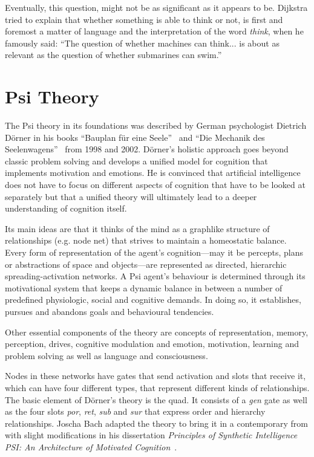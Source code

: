 Eventually, this question, might not be as significant as it appears to be. Dijkstra tried to explain that whether something is able to think or not, is first and foremost a matter of language and the interpretation of the word \emph{think}, when he famously said: ``The question of whether machines can think... is about as relevant as the question of whether submarines can swim.''

    \section{Psi Theory}
The Psi theory in its foundations was described by German psychologist Dietrich Dörner in his books ``Bauplan für eine Seele''~\cite{Doerner1998} and ``Die Mechanik des Seelenwagens''~\cite{dorner2002mechanik} from 1998 and 2002. Dörner's holistic approach goes beyond classic problem solving and develops a unified model for cognition that implements motivation and emotions. He is convinced that artificial intelligence does not have to focus on different aspects of cognition that have to be looked at separately but that a unified theory will ultimately lead to a deeper understanding of cognition itself.

Its main ideas are that it thinks of the mind as a graphlike structure of relationships (e.g. node net) that strives to maintain a homeostatic balance. Every form of representation of the agent's cognition---may it be percepts, plans or abstractions of space and objects---are represented as directed, hierarchic spreading-activation networks. A Psi agent's behaviour is determined through its motivational system that keeps a dynamic balance in between a number of predefined physiologic, social and cognitive demands. In doing so, it establishes, pursues and abandons goals and behavioural tendencies.~\cite{Bach:2009:PSI:1611304}

Other essential components of the theory are concepts of representation, memory, perception, drives, cognitive modulation and emotion, motivation, learning and problem solving as well as language and consciousness.

Nodes in these networks have gates that send activation and slots that receive it, which can have four different types, that represent different kinds of relationships. The basic element of Dörner's theory is the quad. It consists of a \emph{gen} gate as well as the four slots \emph{por}, \emph{ret}, \emph{sub} and \emph{sur} that express order and hierarchy relationships. Joscha Bach adapted the theory to bring it in a contemporary from with slight modifications in his dissertation \emph{Principles of Synthetic Intelligence PSI: An Architecture of Motivated Cognition}~\cite{Bach:2009:PSI:1611304}.

